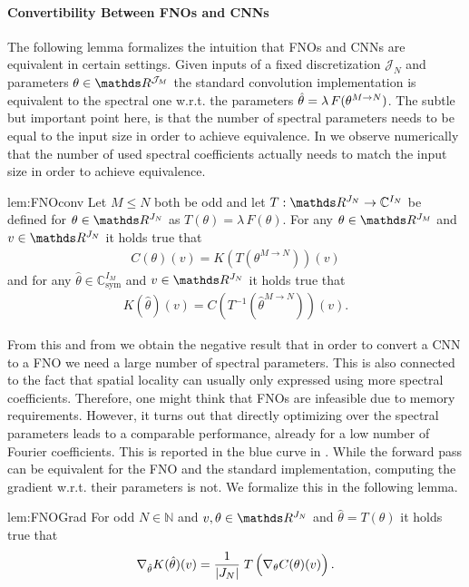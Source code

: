\paragraph{Convertibility Between FNOs and CNNs}
%
%
The following lemma formalizes the intuition that FNOs and CNNs are equivalent in certain settings. Given inputs of a fixed discretization $\mathcal{J}_N$ and parameters $\param\in\R^{\mathcal{J}_M}$ the standard convolution implementation is equivalent to the spectral one w.r.t. the parameters $\hat{\theta} = \lambda\, F(\theta^{M\to N})$. The subtle but important point here, is that the number of spectral parameters needs to be equal to the input size in order to achieve equivalence. In \cite[Fig.3]{kabri2023resolution} we observe numerically that the number of used spectral coefficients actually needs to match the input size in order to achieve equivalence.
%
%
\begin{lemma}{\cite[Lem. 3]{kabri2023resolution}}{lem:FNOconv}
	Let $M \leq N$ both be odd and let $T: \R^{J_N} \rightarrow \mathbb{C}^{I_N}$ be defined for $\theta \in \R^{J_N}$ as
	$T(\theta) = \lambda \, F(\theta)$.
	For any $\theta \in \R^{J_M}$ and $v \in \R^{J_N}$ it holds true that
	\begin{align*}
		C(\theta)(v) = K(T(\theta^{M\rightarrow N}))(v)
	\end{align*}
	and for any $\hat{\theta} \in \mathbb{C}^{I_M}_{\text{sym}}$ and $v \in \R^{J_N}$ it holds true that
	\begin{align*}
		K(\hat{\theta})(v) = C(T^{-1}(\hat{\theta}^{M\rightarrow N}))(v).
	\end{align*}
\end{lemma}
%
%
\noindent%
From this and from \cite[Fig. 3]{kabri2023resolution} we obtain the negative result that in order to convert a CNN to a FNO we need a large number of spectral parameters. This is also connected to the fact that spatial locality can usually only expressed using more spectral coefficients. Therefore, one might think that FNOs are infeasible due to memory requirements. However, it turns out that directly optimizing over the spectral parameters leads to a comparable performance, already for a low number of Fourier coefficients. This is reported in the blue curve in \cite[Fig. 3]{kabri2023resolution}. While the forward pass can be equivalent for the FNO and the standard implementation, computing the gradient w.r.t. their parameters is not. We formalize this in the following lemma.
%
%
\begin{lemma}{\cite[Lem. 4]{kabri2023resolution}}{lem:FNOGrad}
For odd $N \in \mathbb{N}$ and $v, \theta \in \R^{J_N}$ and $\hat{\theta} = T(\theta)$ it holds true that
\begin{align*}
	\nabla_{\hat{\theta}} K(\hat{\theta})(v) = \frac{1}{|J_N|}\; T \left( \vphantom{\hat{\theta}} \nabla_{\theta}C(\theta)(v) \right). 
\end{align*}
\end{lemma}
%
%
